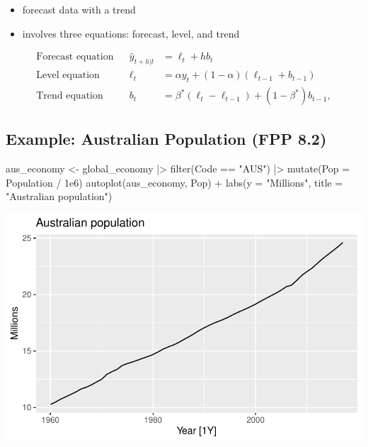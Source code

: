 \documentclass[
  letterpaper,
  DIV=11,
  numbers=noendperiod]{scrartcl}
\newenvironment{Shaded}{\begin{snugshade}}{\end{snugshade}}
\newcommand{\AttributeTok}[1]{\textcolor[rgb]{0.40,0.45,0.13}{#1}}
\newcommand{\FloatTok}[1]{\textcolor[rgb]{0.68,0.00,0.00}{#1}}
\newcommand{\FunctionTok}[1]{\textcolor[rgb]{0.28,0.35,0.67}{#1}}
\newcommand{\NormalTok}[1]{\textcolor[rgb]{0.00,0.23,0.31}{#1}}
\newcommand{\OtherTok}[1]{\textcolor[rgb]{0.00,0.23,0.31}{#1}}
\newcommand{\SpecialCharTok}[1]{\textcolor[rgb]{0.37,0.37,0.37}{#1}}
\newcommand{\StringTok}[1]{\textcolor[rgb]{0.13,0.47,0.30}{#1}}
\providecommand{\tightlist}{%
  \setlength{\itemsep}{0pt}\setlength{\parskip}{0pt}}\usepackage{longtable,booktabs,array}
\begin{document}
\begin{itemize}
\tightlist
\item
  forecast data with a trend
\item
  involves three equations: forecast, level, and trend
\end{itemize}

\[
\begin{aligned}
  \text{Forecast equation}&& \hat{y}_{t+h|t} &= \ell_{t} + hb_{t} \\
  \text{Level equation}   && \ell_{t} &= \alpha y_{t} + (1 - \alpha)(\ell_{t-1} + b_{t-1})\\
  \text{Trend equation}   && b_{t}    &= \beta^*(\ell_{t} - \ell_{t-1}) + (1 -\beta^*)b_{t-1},
\end{aligned}
\]

\subsection{Example: Australian Population (FPP
8.2)}\label{example-australian-population-fpp-8.2}

\begin{Shaded}
\begin{Highlighting}[]
\NormalTok{aus\_economy }\OtherTok{\textless{}{-}}\NormalTok{ global\_economy }\SpecialCharTok{|\textgreater{}}
  \FunctionTok{filter}\NormalTok{(Code }\SpecialCharTok{==} \StringTok{"AUS"}\NormalTok{) }\SpecialCharTok{|\textgreater{}}
  \FunctionTok{mutate}\NormalTok{(}\AttributeTok{Pop =}\NormalTok{ Population }\SpecialCharTok{/} \FloatTok{1e6}\NormalTok{)}
\FunctionTok{autoplot}\NormalTok{(aus\_economy, Pop) }\SpecialCharTok{+}
  \FunctionTok{labs}\NormalTok{(}\AttributeTok{y =} \StringTok{"Millions"}\NormalTok{, }\AttributeTok{title =} \StringTok{"Australian population"}\NormalTok{)}
\end{Highlighting}
\end{Shaded}

\includegraphics{Lecture12_files/figure-pdf/unnamed-chunk-18-1.pdf}
\end{document}
